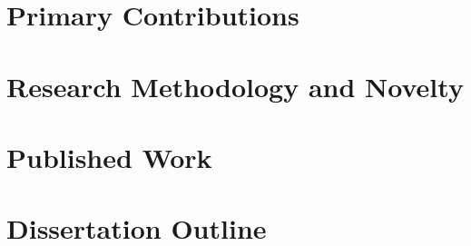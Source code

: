 \section{Primary Contributions}

\section{Research Methodology and Novelty}

\section{Published Work}

\section{Dissertation Outline}
